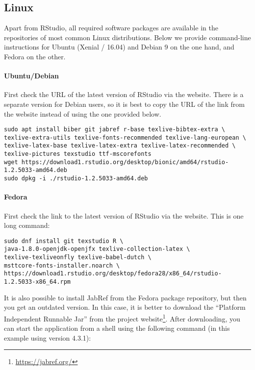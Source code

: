 \subsection{Linux}
\label{ssec:installatie-linux}

Apart from RStudio, all required software packages are available in the repositories of most common Linux distributions. Below we provide command-line instructions for Ubuntu (Xenial / 16.04) and Debian 9 on the one hand, and Fedora on the other.

\paragraph{Ubuntu/Debian} 

First check the URL of the latest version of RStudio via the website. There is a separate version for Debian users, so it is best to copy the URL of the link from the website instead of using the one provided below.

\begin{verbatim}
sudo apt install biber git jabref r-base texlive-bibtex-extra \
texlive-extra-utils texlive-fonts-recommended texlive-lang-european \
texlive-latex-base texlive-latex-extra texlive-latex-recommended \
texlive-pictures texstudio ttf-mscorefonts
wget https://download1.rstudio.org/desktop/bionic/amd64/rstudio-1.2.5033-amd64.deb
sudo dpkg -i ./rstudio-1.2.5033-amd64.deb
\end{verbatim}

\paragraph{Fedora}

First check the link to the latest version of RStudio via the website. This is one long command:

\begin{verbatim}
sudo dnf install git texstudio R \
java-1.8.0-openjdk-openjfx texlive-collection-latex \
texlive-texliveonfly texlive-babel-dutch \
msttcore-fonts-installer.noarch \
https://download1.rstudio.org/desktop/fedora28/x86_64/rstudio-1.2.5033-x86_64.rpm
\end{verbatim}

It is also possible to install JabRef from the Fedora package repository, but then you get an outdated version. In this case, it is better to download the ``Platform Independent Runnable Jar'' from the project website\footnote{\url{https://jabref.org/}}. After downloading, you can start the application from a shell using the following command (in this example using version 4.3.1):

